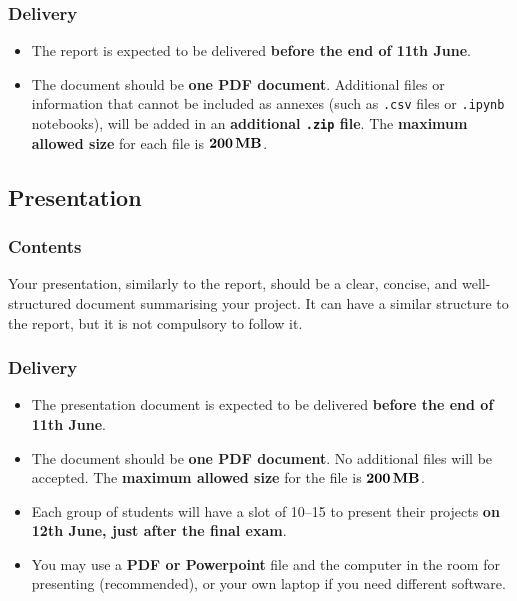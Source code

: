 \documentclass[11pt]{exam}
\begin{document}
    \subsubsection{Delivery}
    \begin{itemize}
        \item The report is expected to be delivered \href{https://atenea.upc.edu/mod/assign/view.php?id=4865448}{} \textbf{before the end of 11th June}.
        \item The document should be \textbf{one PDF document}. Additional files or information that cannot be included as annexes (such as \texttt{.csv} files or \texttt{.ipynb} notebooks), will be added in an \textbf{additional \texttt{.zip} file}. The \textbf{maximum allowed size} for each file is $\SI{\mathbf{200}}{\mathbf{\mega\byte}}$.
    \end{itemize}

    \subsection{Presentation}
    \label{subsec:presentation}
    \subsubsection{Contents}
    Your presentation, similarly to the report, should be a clear, concise, and well-structured document summarising your project. It can have a similar structure to the report, but it is not compulsory to follow it.

    \subsubsection{Delivery}
    \begin{itemize}
        \item The presentation document is expected to be delivered \href{https://atenea.upc.edu/mod/assign/view.php?id=4973442}{} \textbf{before the end of 11th June}.
        \item The document should be \textbf{one PDF document}. No additional files will be accepted. The \textbf{maximum allowed size} for the file is $\SI{\mathbf{200}}{\mathbf{\mega\byte}}$.
        \item Each group of students will have a slot of \SIrange{10}{15}{\min} to present their projects \textbf{on 12th June, just after the final exam}.
        \item You may use a \textbf{PDF or Powerpoint} file and the computer in the room for presenting (recommended), or your own laptop if you need different software.
    \end{itemize}
\end{document}
